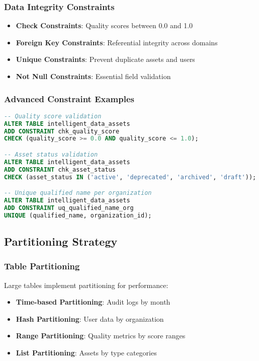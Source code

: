 \subsubsection{Data Integrity Constraints}
\begin{itemize}
    \item \textbf{Check Constraints}: Quality scores between 0.0 and 1.0
    \item \textbf{Foreign Key Constraints}: Referential integrity across domains
    \item \textbf{Unique Constraints}: Prevent duplicate assets and users
    \item \textbf{Not Null Constraints}: Essential field validation
\end{itemize}

\subsubsection{Advanced Constraint Examples}
\begin{lstlisting}[language=SQL, caption=Advanced Constraint Examples]
-- Quality score validation
ALTER TABLE intelligent_data_assets 
ADD CONSTRAINT chk_quality_score 
CHECK (quality_score >= 0.0 AND quality_score <= 1.0);

-- Asset status validation
ALTER TABLE intelligent_data_assets 
ADD CONSTRAINT chk_asset_status 
CHECK (asset_status IN ('active', 'deprecated', 'archived', 'draft'));

-- Unique qualified name per organization
ALTER TABLE intelligent_data_assets 
ADD CONSTRAINT uq_qualified_name_org 
UNIQUE (qualified_name, organization_id);
\end{lstlisting}

\subsection{Partitioning Strategy}

\subsubsection{Table Partitioning}
Large tables implement partitioning for performance:

\begin{itemize}
    \item \textbf{Time-based Partitioning}: Audit logs by month
    \item \textbf{Hash Partitioning}: User data by organization
    \item \textbf{Range Partitioning}: Quality metrics by score ranges
    \item \textbf{List Partitioning}: Assets by type categories
\end{itemize}

